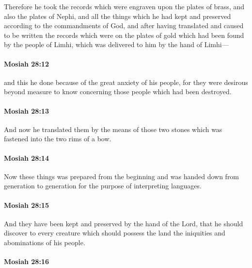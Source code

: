			Therefore he took the records which were engraven upon the plates of brass,
			and also the plates of Nephi,
			and all the things which he had kept and preserved
			according to the commandments of God,
			and after having translated and caused to be written the records
			which were on the plates of gold which had been found by the people of Limhi,
			which was delivered to him by the hand of Limhi---

		\paragraph{Mosiah 28:12} %
			\label{MOSIAH-28-12}

			and this he done because of the great anxiety of his people,
			for they were desirous beyond measure
			to know concerning those people which had been destroyed.

		\paragraph{Mosiah 28:13} %
			\label{MOSIAH-28-13}

			And now he translated them by the means of those two stones
			which was fastened into the two rims of a bow.

		\paragraph{Mosiah 28:14} %
			\label{MOSIAH-28-14}

			Now these things was prepared from the beginning
			and was handed down from generation to generation
			for the purpose of interpreting languages.

		\paragraph{Mosiah 28:15} %
			\label{MOSIAH-28-15}

			And they have been kept and preserved by the hand of the Lord,
			that he should discover to every creature which should possess the land
			the iniquities and abominations of his people.

		\paragraph{Mosiah 28:16} %
			\label{MOSIAH-28-16}

